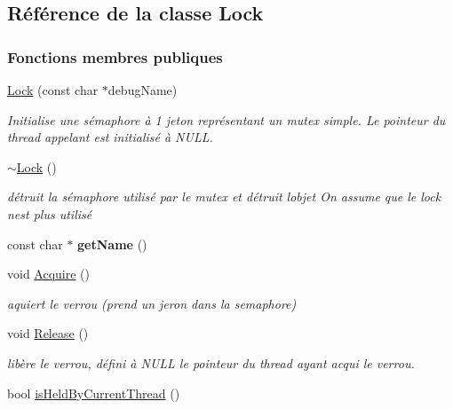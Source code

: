 \hypertarget{class_lock}{}\subsection{Référence de la classe Lock}
\label{class_lock}
\subsubsection*{Fonctions membres publiques}
\begin{DoxyCompactItemize}
\item 
\hyperlink{class_lock_afe45a309ecbd6b3346db887a76f0a9cf}{Lock} (const char $\ast$debug\+Name)
\begin{DoxyCompactList}\small\item\em Initialise une sémaphore à 1 jeton représentant un mutex simple. Le pointeur du thread appelant est initialisé à N\+U\+LL. \end{DoxyCompactList}\item 
\hypertarget{class_lock_a7ab6d9485c8665bb3643710432882971}{}\label{class_lock_a7ab6d9485c8665bb3643710432882971} 
\hyperlink{class_lock_a7ab6d9485c8665bb3643710432882971}{$\sim$\+Lock} ()
\begin{DoxyCompactList}\small\item\em détruit la sémaphore utilisé par le mutex et détruit l\textquotesingle{}objet On assume que le lock n\textquotesingle{}est plus utilisé \end{DoxyCompactList}\item 
\hypertarget{class_lock_a92995bad9c4f3b02b8630c4b0f25daea}{}\label{class_lock_a92995bad9c4f3b02b8630c4b0f25daea} 
const char $\ast$ {\bfseries get\+Name} ()
\item 
\hypertarget{class_lock_ad4c4699fd1ab73f3927b10edc01c54db}{}\label{class_lock_ad4c4699fd1ab73f3927b10edc01c54db} 
void \hyperlink{class_lock_ad4c4699fd1ab73f3927b10edc01c54db}{Acquire} ()
\begin{DoxyCompactList}\small\item\em aquiert le verrou (prend un jeron dans la semaphore) \end{DoxyCompactList}\item 
void \hyperlink{class_lock_a5ca005b84272e56c2bf447056ee9217c}{Release} ()
\begin{DoxyCompactList}\small\item\em libère le verrou, défini à N\+U\+LL le pointeur du thread ayant acqui le verrou. \end{DoxyCompactList}\item 
bool \hyperlink{class_lock_a35b68baf5f5a3165a4e6fe50845a46a2}{is\+Held\+By\+Current\+Thread} ()
\end{DoxyCompactItemize}
